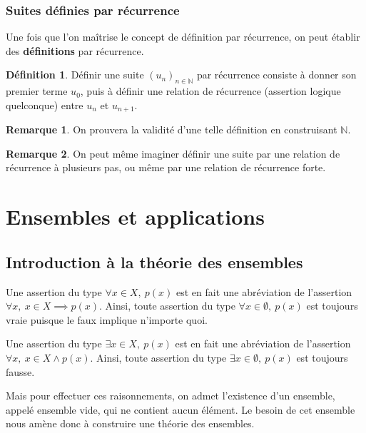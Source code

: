 \documentclass[french]{book}
\newcommand{\N}{\mathbb{N}}
\theoremstyle{plain}
\theoremstyle{definition}
\newtheorem{dfn}{Définition}[chapter]
\newtheorem{rmq}{Remarque}[chapter]
\theoremstyle{remark}
\begin{document}
\subsection{Suites définies par récurrence}
Une fois que l'on maîtrise le concept de définition par récurrence, on peut établir des \textbf{définitions} par récurrence.
\begin{dfn}
	Définir une suite $(u_n)_{n\in\N}$ par récurrence consiste à donner son premier terme $u_0$, puis à définir une relation de récurrence (assertion logique quelconque) entre $u_n$ et $u_{n+1}$.
\end{dfn}
\begin{rmq}
	On prouvera la validité d'une telle définition en construisant $\N$.
\end{rmq}
\begin{rmq}
	On peut même imaginer définir une suite par une relation de récurrence à plusieurs pas, ou même par une relation de récurrence forte.
\end{rmq}
\newpage
\chapter{Ensembles et applications} %
\section{Introduction à la théorie des ensembles}
Une assertion du type $\forall x\in X,\ p(x)$ est en fait une abréviation de l'assertion $\forall x,\ x\in X\implies p(x)$. Ainsi, toute assertion du type $\forall x\in\emptyset,\ p(x)$ est toujours vraie puisque le faux implique n'importe quoi. \par Une assertion du type $\exists x\in X,\ p(x)$ est en fait une abréviation de l'assertion $\forall x,\ x\in X\land p(x)$. Ainsi, toute assertion du type $\exists x\in\emptyset,\ p(x)$ est toujours fausse. \par Mais pour effectuer ces raisonnements, on admet l'existence d'un ensemble, appelé ensemble vide, qui ne contient aucun élément. Le besoin de cet ensemble nous amène donc à construire une théorie des ensembles.
\end{document}
